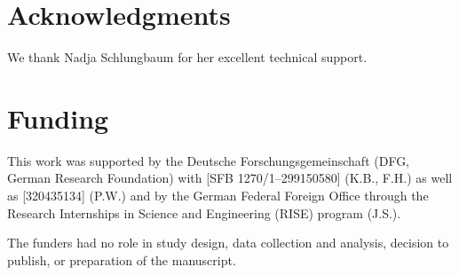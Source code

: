 \documentclass[10pt,letterpaper]{article}
\begin{document}


\section*{Acknowledgments}
We thank Nadja Schlungbaum for her excellent technical support.

\section*{Funding}
This work was supported by the Deutsche Forschungsgemeinschaft (DFG, German Research Foundation) with [SFB 1270/1--299150580] (K.B., F.H.) as well as [320435134] (P.W.) and by the German Federal Foreign Office through the Research Internships in Science and Engineering (RISE) program (J.S.).

The funders had no role in study design, data collection and analysis, decision to publish, or preparation of the manuscript.


\nolinenumbers




\end{document}
